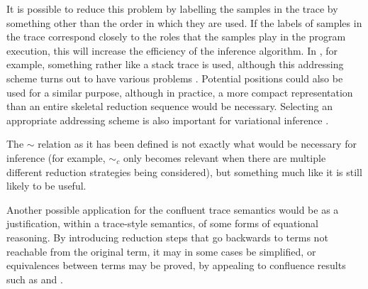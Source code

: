 It is possible to reduce this problem by labelling the samples in the trace by something other than the order in which they are used. If the labels of samples in the trace correspond closely to the roles that the samples play in the program execution, this will increase the efficiency of the inference algorithm. 
In \cite{wingate2011lightweight}, for example, something rather like a stack trace is used, although this addressing scheme turns out to have various problems \cite{kiselyov2016problems,Hur2015a}. 
Potential positions could also be used for a similar purpose, although in practice, a more compact representation than an entire skeletal reduction sequence would be necessary. 
Selecting an appropriate addressing scheme is also important for variational inference \cite{paige2016automatic}.

The $\sim$ relation as it has been defined is not exactly what would be necessary for inference (for example, $\sim_c$ only becomes relevant when there are multiple different reduction strategies being considered), but something much like it is still likely to be useful.

\medskip

Another possible application for the confluent trace semantics would be as a justification, within a trace-style semantics, of some forms of equational reasoning. 
By introducing reduction steps that go backwards to terms not reachable from the original term, it may in some cases be simplified, or equivalences between terms may be proved, by appealing to confluence results such as  and .
 
